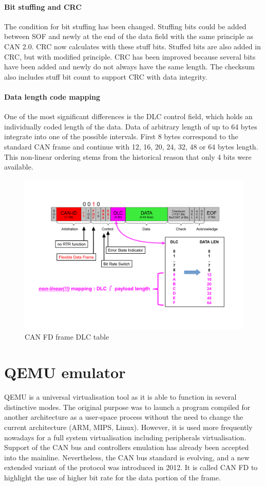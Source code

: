 \documentclass{ctuthesis}
\begin{document}
   \subsubsection{Bit stuffing and CRC}
    The condition for bit stuffing has been changed. Stuffing bits could be added between SOF and newly at the end of the data field with the same principle as CAN 2.0. CRC now calculates with these stuff bits. Stuffed bits are also added in CRC, but with modified principle. CRC has been improved because several bits have been added and newly do not always have the same length. The checksum also includes stuff bit count to support CRC with data integrity.
   \subsubsection{Data length code mapping}
    One of the most significant differences is the DLC control field, which holds an individually coded length of the data. Data of arbitrary length of up to 64 bytes integrate into one of the possible intervals. First 8 bytes correspond to the standard CAN frame and continue with 12, 16, 20, 24, 32, 48 or 64 bytes length. This non-linear ordering stems from the historical reason that only 4 bits were available.
    \begin{figure}[H]
    \includegraphics[width=1\textwidth]{agl2017-socketcan-can_fd_dlc}
    \caption{CAN FD frame DLC table \cite{canfd_dlc}}
    \end{figure}
 
\chapter{QEMU emulator}
 QEMU is a universal virtualisation tool as it is able to function in several distinctive modes. The original purpose was to launch a program compiled for another architecture as a user-space process without the need to change the current architecture (ARM, MIPS, Linux). However, it is used more frequently nowadays for a full system virtualisation including peripherals virtualisation. Support of the CAN bus and controllers emulation has already been accepted into the mainline. Nevertheless, the CAN bus standard  is evolving, and a new extended variant of the protocol was introduced in 2012. It is called CAN FD to highlight the use of higher bit rate for the data portion of the frame.
\end{document}
